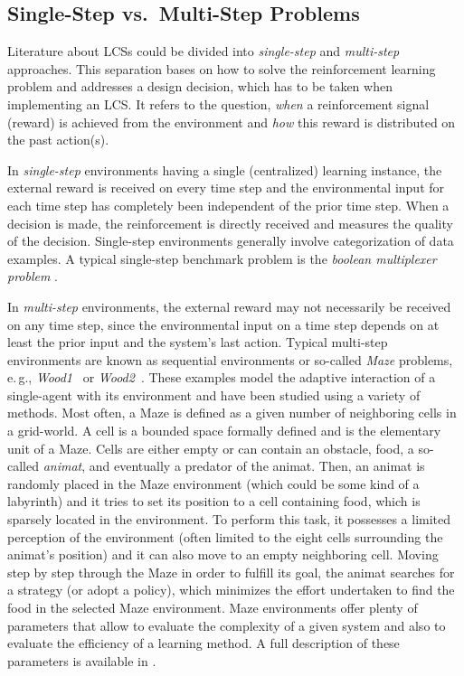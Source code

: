 \subsection{Single-Step vs.\ Multi-Step Problems}
\label{subsection:single-step-vs-multi-step-problems}

Literature about LCSs could be divided into \emph{single-step} and \emph{mul\-ti-step} approaches. This separation bases on how to solve the reinforcement learning problem and addresses a design decision, which has to be taken when implementing an LCS. It refers to the question, \emph{when} a reinforcement signal (reward) is achieved from the environment and \emph{how} this reward is distributed on the past action(s). 

In \emph{single-step} environments having a single (centralized) learning instance, the external reward is received on every time step and the environmental input for each time step has completely been independent of the prior time step. %
When a decision is made, the reinforcement is directly received and measures the quality of the decision. Single-step environments generally involve categorization of data examples. A typical single-step benchmark problem is the \emph{boolean multiplexer problem} \cite{BKLW04,Wil95}. 

In \emph{multi-step} environments, the external reward may not necessarily be received on any time step, since the environmental input on a time step depends on at least the prior input and the system's last action. Typical multi-step environments are known as sequential environments or so-called \emph{Maze} problems, e.\,g., \emph{Wood1}~\cite{Wil94} or \emph{Wood2}~\cite{Wil95}. These examples model the adaptive interaction of a single-agent with its environment and have been studied using a variety of methods. Most often, a Maze is defined as a given number of neighboring cells in a grid-world. A cell is a bounded space formally defined and is the elementary unit of a Maze. Cells are either empty or can contain an obstacle, food, a so-called \emph{animat}, and eventually a predator of the animat. Then, an animat is randomly placed in the Maze environment (which could be some kind of a labyrinth) and it tries to set its position to a cell containing food, which is sparsely located in the environment. To perform this task, it possesses a limited perception of the environment (often limited to the eight cells surrounding the animat's position) and it can also move to an empty neighboring cell. Moving step by step through the Maze in order to fulfill its goal, the animat searches for a strategy (or adopt a policy), which minimizes the effort undertaken to find the food in the selected Maze environment. Maze environments offer plenty of parameters that allow to evaluate the complexity of a given system and also to evaluate the efficiency of a learning method. A full description of these parameters is available in \cite{BZ05}.

